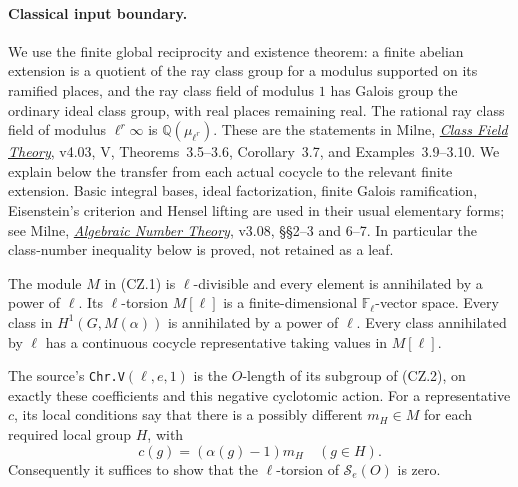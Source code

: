 \paragraph{Classical input boundary.}
We use the finite global reciprocity and existence theorem: a finite
abelian extension is a quotient of the ray class group for a modulus
supported on its ramified places, and the ray class field of modulus
$1$ has Galois group the ordinary ideal class group, with real places
remaining real.  The rational ray class field of modulus
$\ell^r\infty$ is $\mathbb Q(\mu_{\ell^r})$.
These are the statements in Milne,
\href{https://www.jmilne.org/math/CourseNotes/CFT.pdf}{\emph{Class
Field Theory}}, v4.03, V, Theorems~3.5--3.6, Corollary~3.7,
and Examples~3.9--3.10.  We explain below the transfer from each
actual cocycle to the relevant finite extension.  Basic integral
bases, ideal factorization, finite Galois ramification, Eisenstein's
criterion and Hensel lifting are used in their usual elementary forms;
see Milne,
\href{https://www.jmilne.org/math/CourseNotes/ANT.pdf}{\emph{Algebraic
Number Theory}}, v3.08, \S\S2--3 and 6--7.  In particular the
class-number inequality below is proved, not retained as a leaf.

\begin{proposition}
\label{prop:cz-coefficients}
The module $M$ in (CZ.1) is $\ell$-divisible and every element is
annihilated by a power of $\ell$.  Its $\ell$-torsion $M[\ell]$
is a finite-dimensional $\mathbb F_\ell$-vector space.  Every class
in $H^1(G,M(\alpha))$ is annihilated by a power of $\ell$.
Every class annihilated by $\ell$ has a continuous cocycle
representative taking values in $M[\ell]$.

The source's \texttt{Chr.V}$(\ell,e,1)$ is the $O$-length of
its subgroup of (CZ.2), on exactly these coefficients and this
negative cyclotomic action.  For a representative $c$, its local
conditions say that there is a possibly different $m_H\in M$ for
each required local group $H$, with
\[
                  c(g)=(\alpha(g)-1)m_H\quad(g\in H).
                  \tag{CZ.3}
\]
Consequently it suffices to show that the $\ell$-torsion of
$\mathcal S_e(O)$ is zero.
\end{proposition}


